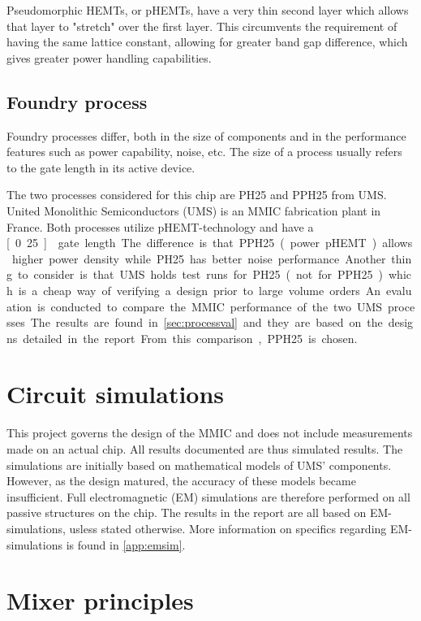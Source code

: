 			Pseudomorphic HEMTs, or pHEMTs, have a very thin second layer which allows that layer to "stretch" over the first layer. This circumvents the requirement of having the same lattice constant, allowing for greater band gap difference, which gives greater power handling capabilities.

		\subsection{Foundry process}
			Foundry processes differ, both in the size of components and in the performance features such as power capability, noise, etc. The size of a process usually refers to the gate length in its active device.

			The two processes considered for this chip are PH25 and PPH25 from UMS. United Monolithic Semiconductors (UMS) is an MMIC fabrication plant in France. Both processes utilize pHEMT-technology and have a \unit[0.25]{\mum} gate length. The difference is that PPH25 (power pHEMT) allows higher power density while PH25 has better noise performance. Another thing to consider is that UMS holds test runs for PH25 (not for PPH25) which is a cheap way of verifying a design prior to large volume orders.

			An evaluation is conducted to compare the MMIC performance of the two UMS processes. The results are found in \autoref{sec:processval} and they are based on the designs detailed in the report. From this comparison, PPH25 is chosen.

	\section{Circuit simulations}
		This project governs the design of the MMIC and does not include measurements made on an actual chip. All results documented are thus simulated results. The simulations are initially based on mathematical models of UMS' components. However, as the design matured, the accuracy of these models became insufficient. Full electromagnetic (EM) simulations are therefore performed on all passive structures on the chip. The results in the report are all based on EM-simulations, usless stated otherwise. More information on specifics regarding EM-simulations is found in \autoref{app:emsim}.

	\section{Mixer principles}\label{ch:introduction_mixer}
